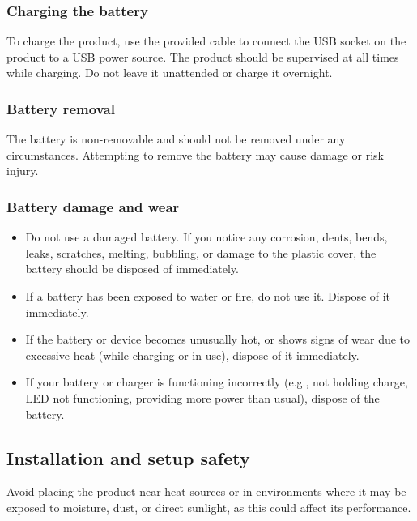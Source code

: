 
\subsubsection{Charging the battery}

To charge the product, use the provided cable to connect the USB socket on the product to a USB power source.  The product should be supervised at all times while charging. Do not leave it unattended or charge it overnight.

\subsubsection{Battery removal}

The battery is non-removable and should not be removed under any circumstances. Attempting to remove the battery may cause damage or risk injury.

\subsubsection{Battery damage and wear}

\begin{itemize}
    \item Do not use a damaged battery. If you notice any corrosion, dents, bends, leaks, scratches, melting, bubbling, or damage to the plastic cover, the battery should be disposed of immediately.
    \item If a battery has been exposed to water or fire, do not use it. Dispose of it immediately.
    \item If the battery or device becomes unusually hot, or shows signs of wear due to excessive heat (while charging or in use), dispose of it immediately.
    \item If your battery or charger is functioning incorrectly (e.g., not holding charge, LED not functioning, providing more power than usual), dispose of the battery.
\end{itemize}

\subsection{Installation and setup safety}

Avoid placing the product near heat sources or in environments where it may be exposed to moisture, dust, or direct sunlight, as this could affect its performance.

